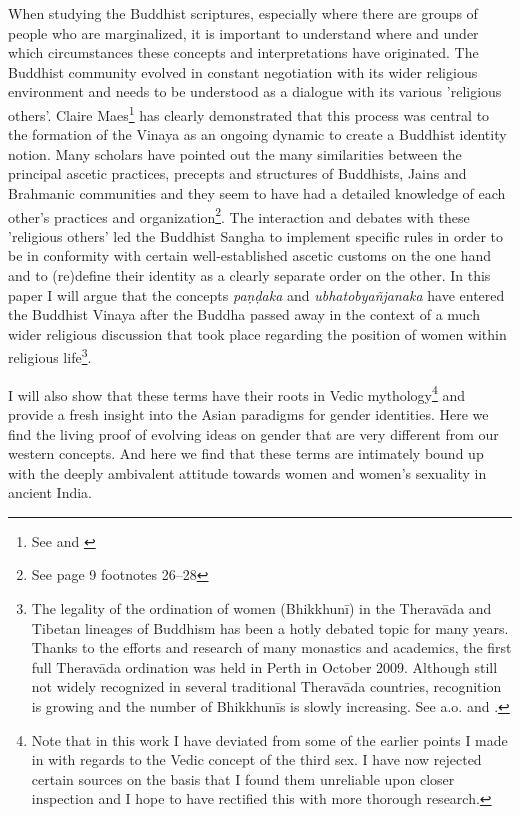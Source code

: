 When studying the Buddhist scriptures, especially where there are groups of people who are marginalized, it is important to understand where and under which circumstances these concepts and interpretations have originated. The Buddhist community evolved in constant negotiation with its wider religious environment and needs to be understood as a dialogue with its various 'religious others'. Claire Maes\footnote{See \cite{maes} and \cite{maes2016}} has clearly demonstrated that this process was central to the formation of the Vinaya as an ongoing dynamic to create a Buddhist identity notion. Many scholars have pointed out the many similarities between the principal ascetic practices, precepts and structures of Buddhists, Jains and Brahmanic communities and they seem to have had a detailed knowledge of each other's practices and organization\footnote{See \cite{maes2016} page 9 footnotes 26–28}. The interaction and debates with these 'religious others' led the Buddhist Sangha to implement specific rules in order to be in conformity with certain well-established ascetic customs on the one hand and to (re)define their identity as a clearly separate order on the other. In this paper I will argue that the concepts {\em paṇḍaka} and {\em ubhatob­yañ­janaka} have entered the Buddhist Vinaya after the Buddha passed away in the context of a much wider religious discussion that took place regarding the position of women within religious life\footnote{The legality of the ordination of women (Bhikkhunī) in the Theravāda and Tibetan lineages of Buddhism has been a hotly debated topic for many years. Thanks to the efforts and research of many monastics and academics, the first full Theravāda ordination was held in Perth in October 2009. Although still not widely recognized in several traditional Theravāda countries, recognition is growing and the number of Bhikkhunīs is slowly increasing. See a.o. \cite{sujato2009} and \cite{analayo2013}.}. 

I will also show that these terms have their roots in Vedic mythology\footnote{Note that in this work I have deviated from some of the earlier points I made in \cite{vimala} with regards to the Vedic concept of the third sex. I have now rejected certain sources on the basis that I found them unreliable upon closer inspection and I hope to have rectified this with more thorough research.} and provide a fresh insight into the Asian paradigms for gender identities. Here we find the living proof of evolving ideas on gender that are very different from our western concepts. And here we find that these terms are intimately bound up with the deeply ambivalent attitude towards women and women's sexuality in ancient India.

